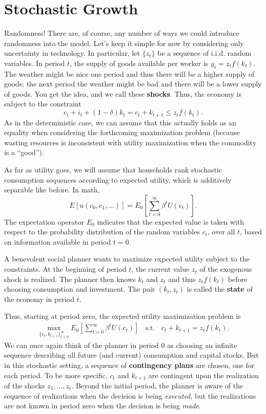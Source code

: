\documentclass[12pt]{article}
\theoremstyle{definition}
\begin{document}
\maketitle
\onehalfspace




\section{Stochastic Growth}
Randomness! There are, of course, any number of ways we could introduce randomness into the model. Let's keep it simple for now by considering only uncertainty in technology. In particular, let $\{z_t\}$ be a sequence of i.i.d. random variables. In period $t$, the supply of goods available per worker is $y_t = z_t f(k_t)$. The weather might be nice one period and thus there will be a higher supply of goods; the next period the weather might be bad and there will be a lower supply of goods. You get the idea, and we call these \textbf{shocks}. Thus, the economy is subject to the constraint
	\[c_t + i_t + (1 - \delta)k_t = c_t + k_{t+1}  \leq z_t f(k_t).	\]
As in the deterministic case, we can assume that this actually holds as an equality when considering the forthcoming maximization problem (because wasting resources is inconsistent with utility maximization when the commodity is a ``good'').

As far as utility goes, we will assume that households rank stochastic consumption sequences according to expected utility, which is additively separable like before. In math,
	\[E[ u(c_0, c_1, ...)] = E_0 \left[ \sum_{t=0}^{\infty} \beta^t U(c_t) \right].	\]
The expectation operator $E_0$ indicates that the expected value is taken with respect to the probability distribution of the random variables $c_t$, over all $t$, based on information available in period $t=0$. 

A benevolent social planner wants to maximize expected utility subject to the constraints. At the beginning of period $t$, the current value $z_t$ of the exogenous shock is realized. The planner then knows $k_t$ and $z_t$ and thus $z_t f(k_t)$ before choosing consumption and investment. The pair $(k_t, z_t)$ is called the \textbf{state} of the economy in period $t$. 

Thus, starting at period zero, the expected utility maximization problem is
\begin{align}
	\max_{\{c_t, k_{t+1} \}_{t=0}^{\infty}} E_0\left[ \sum_{t=0}^{\infty} \beta^t U(c_t) \right] \;\; \text{ s.t. } \;\; c_t + k_{t+1} = z_t f(k_t).
\end{align}
We can once again think of the planner in period 0 as choosing an infinite sequence describing all future (and current) consumption and capital stocks. But in this stochastic setting, a sequence of \textbf{contingency plans} are chosen, one for each period. To be more specific, $c_t$ and $k_{t+1}$ are contingent upon the realization of the shocks $z_1, ..., z_t$. Beyond the initial period, the planner is aware of the sequence of realizations when the decision is being \emph{executed}, but the realizations are not known in period zero when the decision is being \emph{made}.
\end{document}
